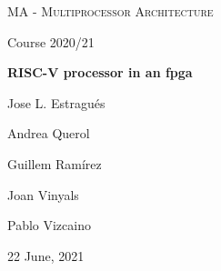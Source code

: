 \makeatletter

\begin{titlepage}
\thispagestyle{empty}
\begin{center}
	\centering
	\vspace{1cm}
	{\scshape\Large MA - Multiprocessor Architecture  \par}
	\vspace{0.75cm}
	{\Large Course 2020/21 \par}
	\vspace{0.75cm} 
	{\huge\bfseries RISC-V processor in an \acrshort{fpga} \par}
	\vspace{1cm}
	{\Large Jose L. Estragués \par  Andrea Querol \par  Guillem Ramírez \par  Joan Vinyals \par  Pablo Vizcaino}
	\vspace{1cm}
    \vspace{0.5cm}
    

 \vfill
	{\large 22 June, 2021\par}
\end{center}


\clearpage
\end{titlepage}

